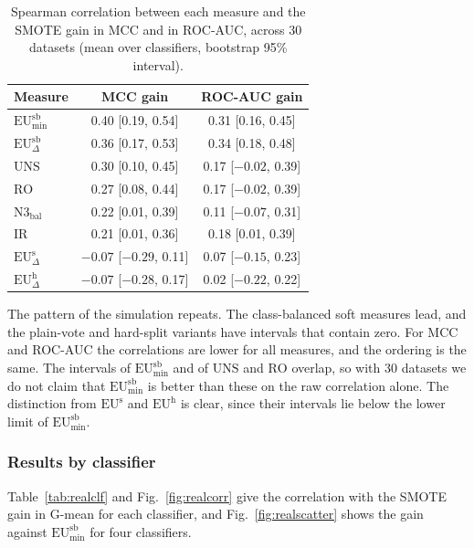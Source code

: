 \documentclass[preprint,12pt]{elsarticle}
\newcommand{\EUmin}[1]{\mathrm{EU}^{\mathrm{#1}}_{\min}}
\newcommand{\EUdif}[1]{\mathrm{EU}^{\mathrm{#1}}_{\Delta}}
\newcommand{\IR}{\mathrm{IR}}
\newcommand{\UNS}{\mathrm{UNS}}
\newcommand{\RO}{\mathrm{RO}}
\newcommand{\Nbal}{\mathrm{N3}_{\mathrm{bal}}}
\begin{document}
\begin{table}[H]
\centering
\caption{Spearman correlation between each measure and the SMOTE gain in MCC and in ROC-AUC, across 30 datasets (mean over classifiers, bootstrap 95\% interval).}\label{tab:other}
\small\setlength{\tabcolsep}{4pt}
\begin{tabular}{lcc}
\toprule
Measure & MCC gain & ROC-AUC gain \\
\midrule
$\EUmin{sb}$ & 0.40 [0.19, 0.54] & 0.31 [0.16, 0.45] \\
$\EUdif{sb}$ & 0.36 [0.17, 0.53] & 0.34 [0.18, 0.48] \\
$\UNS$ & 0.30 [0.10, 0.45] & 0.17 [$-0.02$, 0.39] \\
$\RO$ & 0.27 [0.08, 0.44] & 0.17 [$-0.02$, 0.39] \\
$\Nbal$ & 0.22 [0.01, 0.39] & 0.11 [$-0.07$, 0.31] \\
$\IR$ & 0.21 [0.01, 0.36] & 0.18 [0.01, 0.39] \\
$\EUdif{s}$ & $-0.07$ [$-0.29$, 0.11] & 0.07 [$-0.15$, 0.23] \\
$\EUdif{h}$ & $-0.07$ [$-0.28$, 0.17] & 0.02 [$-0.22$, 0.22] \\
\bottomrule
\end{tabular}
\end{table}

The pattern of the simulation repeats. The class-balanced soft measures lead, and the plain-vote and hard-split variants have intervals that contain zero. For MCC and ROC-AUC the correlations are lower for all measures, and the ordering is the same. The intervals of $\EUmin{sb}$ and of $\UNS$ and $\RO$ overlap, so with 30 datasets we do not claim that $\EUmin{sb}$ is better than these on the raw correlation alone. The distinction from $\mathrm{EU}^{\mathrm{s}}$ and $\mathrm{EU}^{\mathrm{h}}$ is clear, since their intervals lie below the lower limit of $\EUmin{sb}$.

\subsubsection{Results by classifier}
Table~\ref{tab:realclf} and Fig.~\ref{fig:realcorr} give the correlation with the SMOTE gain in G-mean for each classifier, and Fig.~\ref{fig:realscatter} shows the gain against $\EUmin{sb}$ for four classifiers.
\end{document}

